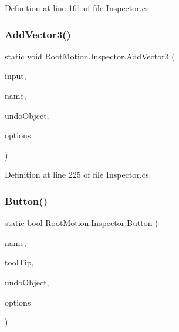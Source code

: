 Definition at line 161 of file Inspector.\+cs.

\mbox{\label{class_root_motion_1_1_inspector_a3f84ec4eb58f18783745ecc0c721b559}} 
\subsubsection{\texorpdfstring{Add\+Vector3()}{AddVector3()}}
{\footnotesize\ttfamily static void Root\+Motion.\+Inspector.\+Add\+Vector3 (\begin{DoxyParamCaption}\item[{ref Vector3}]{input,  }\item[{string}]{name,  }\item[{\mbox{\hyperlink{_quads_8cs_aef19bab18b9814edeef255c43e4f6bbc}{Object}}}]{undo\+Object,  }\item[{params G\+U\+I\+Layout\+Option \mbox{[}$\,$\mbox{]}}]{options }\end{DoxyParamCaption})\hspace{0.3cm}{\ttfamily [static]}}



Definition at line 225 of file Inspector.\+cs.

\mbox{\label{class_root_motion_1_1_inspector_aa7a4a02d9390a27d9df08d4ea5881933}} 
\subsubsection{\texorpdfstring{Button()}{Button()}}
{\footnotesize\ttfamily static bool Root\+Motion.\+Inspector.\+Button (\begin{DoxyParamCaption}\item[{string}]{name,  }\item[{string}]{tool\+Tip,  }\item[{\mbox{\hyperlink{_quads_8cs_aef19bab18b9814edeef255c43e4f6bbc}{Object}}}]{undo\+Object,  }\item[{params G\+U\+I\+Layout\+Option \mbox{[}$\,$\mbox{]}}]{options }\end{DoxyParamCaption})\hspace{0.3cm}{\ttfamily [static]}}



